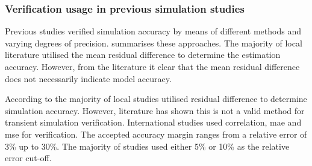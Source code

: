  	\subsubsection{Verification usage in previous simulation studies}
 	Previous studies verified simulation accuracy by means of different methods and varying degrees of precision.  summarises these approaches. The majority of local literature utilised the mean residual difference to determine the estimation accuracy. However, from the literature it clear that the mean residual difference does not necessarily indicate model accuracy. 
 	\par 
 	 According to  the majority of local studies utilised residual difference to determine simulation accuracy. However, literature has shown this is not a valid method for transient simulation verification. International studies used correlation, \gls{mae} and \gls{mse} for verification. The accepted accuracy margin ranges from a relative error of 3\% up to 30\%. The majority of studies used either 5\% or 10\%  as the relative error cut-off.
 	 \\
